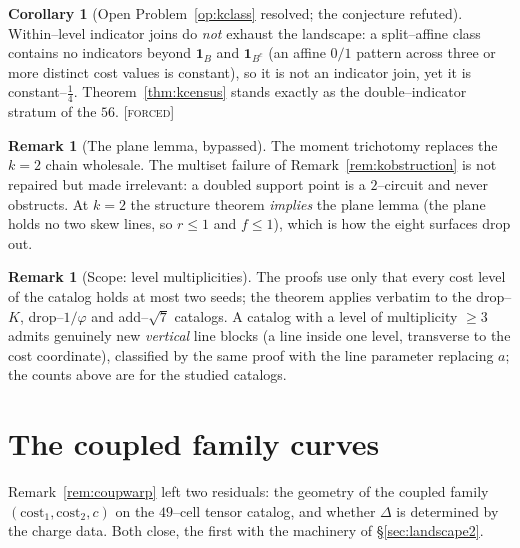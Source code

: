 \documentclass[11pt]{article}
\theoremstyle{definition}
\newtheorem{remark}[theorem]{Remark}
\newtheorem{corollary}[theorem]{Corollary}
\newcommand{\ph}{\varphi}
\newcommand{\forcedtag}{{\scshape [forced]}}
\begin{document}
\begin{corollary}[Open Problem~\ref{op:kclass} resolved; the conjecture refuted]\label{cor:landres}
Within--level indicator joins do \emph{not} exhaust the landscape: a split--affine class
contains no indicators beyond $\mathbf 1_B$ and $\mathbf 1_{B^c}$ (an affine $0/1$ pattern
across three or more distinct cost values is constant), so it is not an indicator join, yet it
is constant--$\tfrac14$. Theorem~\ref{thm:kcensus} stands exactly as the double--indicator
stratum of the $56$. \forcedtag
\end{corollary}

\begin{remark}[The plane lemma, bypassed]\label{rem:planebypass}
The moment trichotomy replaces the $k=2$ chain wholesale. The multiset failure of
Remark~\ref{rem:kobstruction} is not repaired but made irrelevant: a doubled support point is a
$2$--circuit and never obstructs. At $k=2$ the structure theorem \emph{implies} the plane lemma
(the plane holds no two skew lines, so $r\le1$ and $f\le1$), which is how the eight surfaces
drop out.
\end{remark}

\begin{remark}[Scope: level multiplicities]\label{rem:fatlevels}
The proofs use only that every cost level of the catalog holds at most two seeds; the theorem
applies verbatim to the drop--$K$, drop--$1/\ph$ and add--$\sqrt7$ catalogs. A catalog with a
level of multiplicity $\ge3$ admits genuinely new \emph{vertical} line blocks (a line inside one
level, transverse to the cost coordinate), classified by the same proof with the line parameter
replacing $a$; the counts above are for the studied catalogs.
\end{remark}

\section{The coupled family curves}\label{sec:coupledcurv}

Remark~\ref{rem:coupwarp} left two residuals: the geometry of the coupled family
$(\mathrm{cost}_1,\mathrm{cost}_2,c)$ on the $49$--cell tensor catalog, and whether $\Delta$ is
determined by the charge data. Both close, the first with the machinery of
\S\ref{sec:landscape2}.
\end{document}
